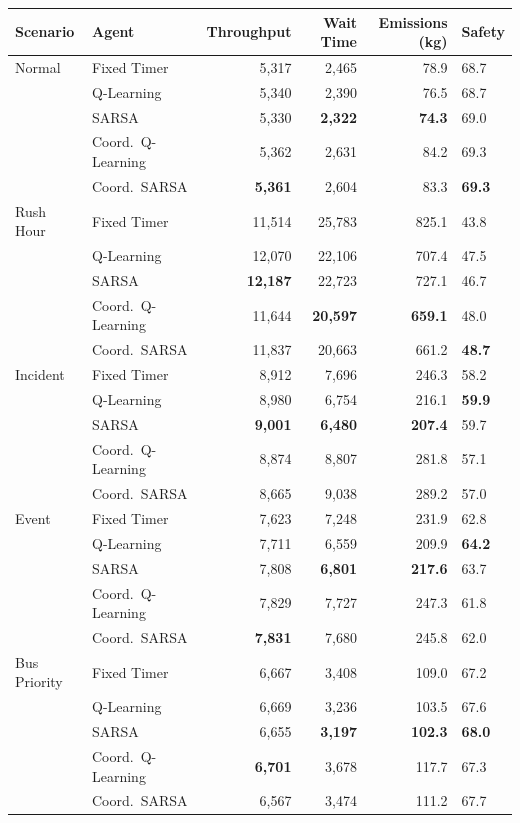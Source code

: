 \documentclass[12pt, a4paper]{article}
\begin{document}
\begin{center}
\small
\begin{tabular}{llrrrl}
    \toprule
    \textbf{Scenario} & \textbf{Agent} & \textbf{Throughput} & \textbf{Wait Time} & \textbf{Emissions (kg)} & \textbf{Safety} \\
    \midrule
    Normal & Fixed Timer & 5,317 & 2,465 & 78.9 & 68.7 \\
           & Q-Learning  & 5,340 & 2,390 & 76.5 & 68.7 \\
           & SARSA       & 5,330 & \textbf{2,322} & \textbf{74.3} & 69.0 \\
           & Coord.\ Q-Learning & 5,362 & 2,631 & 84.2 & 69.3 \\
           & Coord.\ SARSA      & \textbf{5,361} & 2,604 & 83.3 & \textbf{69.3} \\
    \midrule
    Rush Hour & Fixed Timer & 11,514 & 25,783 & 825.1 & 43.8 \\
              & Q-Learning  & 12,070 & 22,106 & 707.4 & 47.5 \\
              & SARSA       & \textbf{12,187} & 22,723 & 727.1 & 46.7 \\
              & Coord.\ Q-Learning & 11,644 & \textbf{20,597} & \textbf{659.1} & 48.0 \\
              & Coord.\ SARSA      & 11,837 & 20,663 & 661.2 & \textbf{48.7} \\
    \midrule
    Incident & Fixed Timer & 8,912 & 7,696 & 246.3 & 58.2 \\
             & Q-Learning  & 8,980 & 6,754 & 216.1 & \textbf{59.9} \\
             & SARSA       & \textbf{9,001} & \textbf{6,480} & \textbf{207.4} & 59.7 \\
             & Coord.\ Q-Learning & 8,874 & 8,807 & 281.8 & 57.1 \\
             & Coord.\ SARSA      & 8,665 & 9,038 & 289.2 & 57.0 \\
    \midrule
    Event & Fixed Timer & 7,623 & 7,248 & 231.9 & 62.8 \\
          & Q-Learning  & 7,711 & 6,559 & 209.9 & \textbf{64.2} \\
          & SARSA       & 7,808 & \textbf{6,801} & \textbf{217.6} & 63.7 \\
          & Coord.\ Q-Learning & 7,829 & 7,727 & 247.3 & 61.8 \\
          & Coord.\ SARSA      & \textbf{7,831} & 7,680 & 245.8 & 62.0 \\
    \midrule
    Bus Priority & Fixed Timer & 6,667 & 3,408 & 109.0 & 67.2 \\
                 & Q-Learning  & 6,669 & 3,236 & 103.5 & 67.6 \\
                 & SARSA       & 6,655 & \textbf{3,197} & \textbf{102.3} & \textbf{68.0} \\
                 & Coord.\ Q-Learning & \textbf{6,701} & 3,678 & 117.7 & 67.3 \\
                 & Coord.\ SARSA      & 6,567 & 3,474 & 111.2 & 67.7 \\
    \bottomrule
\end{tabular}
\end{center}
\end{document}
